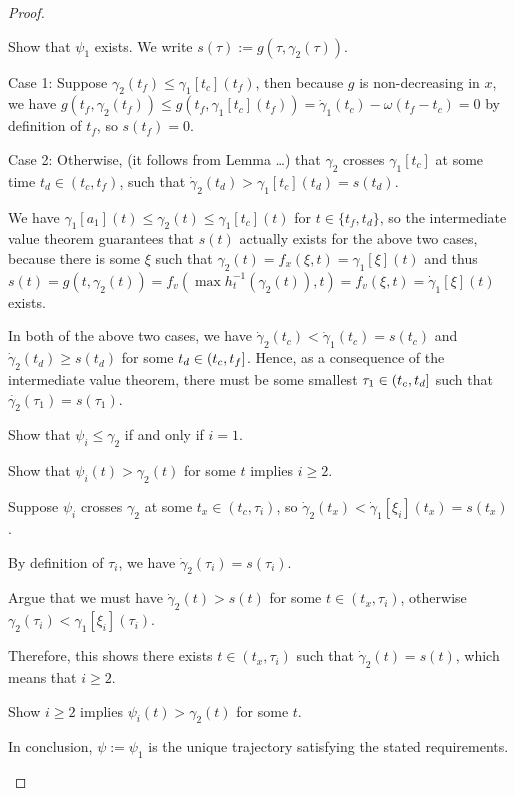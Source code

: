 \documentclass[a4paper]{article}
\theoremstyle{definition}
\theoremstyle{plain}
\begin{document}
\begin{proof}
\begin{outline}
  \1 Show that $\psi_{1}$ exists. We write $s(\tau) := g(\tau, \gamma_{2}(\tau))$.

  \2 Case 1: Suppose $\gamma_{2}(t_{f}) \leq \gamma_{1}[t_{c}](t_{f})$, then because $g$ is
  non-decreasing in $x$, we have
  $g(t_{f}, \gamma_{2}(t_{f})) \leq g(t_{f}, \gamma_{1}[t_{c}](t_{f})) = \dot{\gamma}_{1}(t_{c}) - \omega(t_{f} - t_{c}) = 0$
  by definition of $t_{f}$, so $s(t_{f}) = 0$.

  \2 Case 2: Otherwise, (it follows from Lemma \dots) that $\gamma_{2}$ crosses
  $\gamma_{1}[t_{c}]$ at some time $t_{d} \in (t_{c}, t_{f})$, such that
  $\dot{\gamma}_{2}(t_{d}) > \gamma_{1}[t_{c}](t_{d}) = s(t_{d})$.

  \2 We have
  $\gamma_{1}[a_{1}](t) \leq \gamma_{2}(t) \leq \gamma_{1}[t_{c}](t)$
  for $t \in \{ t_{f}, t_{d} \}$, so the intermediate value theorem guarantees
  that $s(t)$ actually exists for the above two cases, because there is some
  $\xi$ such that
  $\gamma_{2}(t) = f_{x}(\xi, t) = \gamma_{1}[\xi](t)$ and thus
  $s(t) = g(t, \gamma_{2}(t)) = f_{v}(\max h_{t}^{-1}(\gamma_{2}(t)), t) = f_{v}(\xi, t) = \dot{\gamma}_{1}[\xi](t)$
  exists.

  \2 In both of the above two cases, we have
  $\dot{\gamma}_{2}(t_{c}) < \dot{\gamma}_{1}(t_{c}) = s(t_{c})$ and
  $\dot{\gamma}_{2}(t_{d}) \geq s(t_{d})$ for some $t_{d} \in (t_{c},t_{f}]$.
  Hence, as a consequence of the intermediate value theorem, there must be some
  smallest $\tau_{1} \in (t_{c},t_{d}]$ such that
  $\dot{\gamma_{2}}(\tau_{1}) = s(\tau_{1})$.

  \1 Show that $\psi_{i} \leq \gamma_{2}$ if and only if $i=1$.

  \2 Show that $\psi_{i}(t) > \gamma_{2}(t)$ for some $t$ implies $i \geq 2$.

  \3 Suppose $\psi_{i}$ crosses $\gamma_{2}$ at some $t_{x} \in (t_{c}, \tau_{i})$, so
  $\dot{\gamma}_{2}(t_{x}) < \dot{\gamma}_{1}[\xi_{i}](t_{x}) = s(t_{x})$.

  \3 By definition of $\tau_{i}$, we have $\dot{\gamma}_{2}(\tau_{i}) = s(\tau_{i})$.

  \3 Argue that we must have $\dot{\gamma}_{2}(t) > s(t)$ for some $t \in (t_{x}, \tau_{i})$, otherwise $\gamma_{2}(\tau_{i}) < \gamma_{1}[\xi_{i}](\tau_{i})$.

  \3 Therefore, this shows there exists $t \in (t_{x}, \tau_{i})$ such that
  $\dot{\gamma}_{2}(t) = s(t)$, which means that $i \geq 2$.

  \2 Show $i \geq 2$ implies $\psi_{i}(t) > \gamma_{2}(t)$ for some $t$.

  \2 In conclusion, $\psi := \psi_{1}$ is the unique trajectory satisfying the
  stated requirements.

  \qedhere

\end{outline}
\end{proof}
\end{document}
